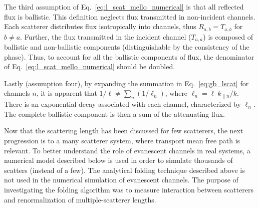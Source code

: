 The third assumption of Eq.~\ref{eq:l_scat_mello_numerical} is that all reflected flux is ballistic. This definition neglects flux transmitted in non-incident channels.
Each scatterer distributes flux isotropically into channels, thus $R_{a,b}=T_{a,b}$ for $b \neq a$. %
Further, the flux transmitted in the incident channel ($T_{a,a}$) is composed of ballistic and non-ballistic components (distinguishable by the consistency of the phase). Thus, to account for all the ballistic components of flux, the denominator of Eq.~\ref{eq:l_scat_mello_numerical} should be doubled.

Lastly (assumption four), by expanding the summation in Eq.~\ref{eq:gb_lscat} for channels $n$, it is apparent that $1/\ell\neq\sum_n (1/\ell_n)$, where $\ell_n = \ell\ k_{\parallel n}/k$. There is an exponential decay associated with each channel, characterized by $\ell_n$. The complete ballistic component is then a sum of the attenuating flux.


Now that the scattering length has been discussed for few scatterers, the next progression is to a many scatterer system, where transport mean free path is relevant. To better understand the role of evanescent channels in real systems, a numerical model described below is used in order to simulate thousands of scatters (instead of a few). The analytical folding technique described above is not used in the numerical simulation of  evanescent channels. The purpose of investigating the folding algorithm was to measure interaction between scatterers and renormalization of multiple-scatterer lengths. 



